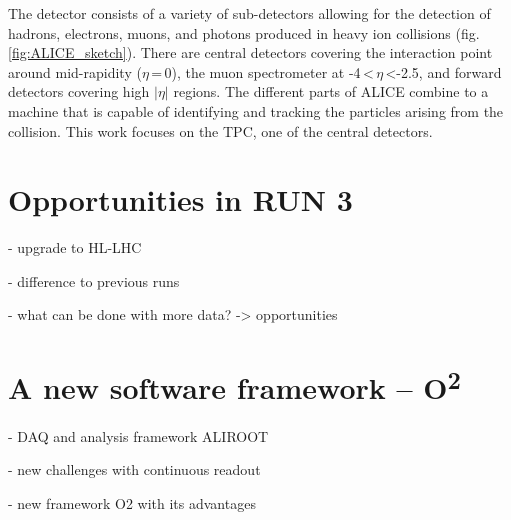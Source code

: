 The detector consists of a variety of sub-detectors allowing for the detection of hadrons, electrons, muons, and photons produced in heavy ion collisions (fig. \ref{fig:ALICE_sketch}). There are central detectors covering the interaction point around mid-rapidity ($\eta$\,=\,0), the muon spectrometer at -4\,<\,$\eta$\,<-2.5, and forward detectors covering high $\vert\eta\vert$ regions. The different parts of ALICE combine to a machine that is capable of identifying and tracking the particles arising from the collision. This work focuses on the TPC, one of the central detectors.
\section{Opportunities in RUN 3}
- upgrade to HL-LHC

- difference to previous runs

- what can be done with more data? -> opportunities
\section{A new software framework -- O\textsuperscript{2}}
- DAQ and analysis framework ALIROOT

- new challenges with continuous readout

- new framework O2 with its advantages